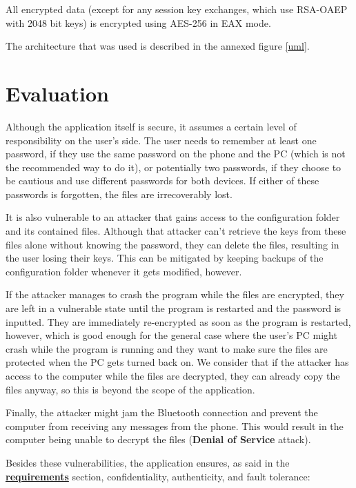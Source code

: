 \documentclass[11,]{article}
\begin{document}
All encrypted data (except for any session key exchanges, which use
RSA-OAEP with 2048 bit keys) is encrypted using AES-256 in EAX mode.

The architecture that was used is described in the annexed figure
\ref{uml}.

\hypertarget{evaluation}{%
\section{Evaluation}\label{evaluation}}

Although the application itself is secure, it assumes a certain level of
responsibility on the user's side. The user needs to remember at least
one password, if they use the same password on the phone and the PC
(which is not the recommended way to do it), or potentially two
passwords, if they choose to be cautious and use different passwords for
both devices. If either of these passwords is forgotten, the files are
irrecoverably lost.

It is also vulnerable to an attacker that gains access to the
configuration folder and its contained files. Although that attacker
can't retrieve the keys from these files alone without knowing the
password, they can delete the files, resulting in the user losing their
keys. This can be mitigated by keeping backups of the configuration
folder whenever it gets modified, however.

If the attacker manages to crash the program while the files are
encrypted, they are left in a vulnerable state until the program is
restarted and the password is inputted. They are immediately
re-encrypted as soon as the program is restarted, however, which is good
enough for the general case where the user's PC might crash while the
program is running and they want to make sure the files are protected
when the PC gets turned back on. We consider that if the attacker has
access to the computer while the files are decrypted, they can already
copy the files anyway, so this is beyond the scope of the application.

Finally, the attacker might jam the Bluetooth connection and prevent the
computer from receiving any messages from the phone. This would result
in the computer being unable to decrypt the files (\textbf{Denial of
Service} attack).

Besides these vulnerabilities, the application ensures, as said in the
\protect\hyperlink{requirements}{\textbf{requirements}} section,
confidentiality, authenticity, and fault tolerance:
\end{document}
